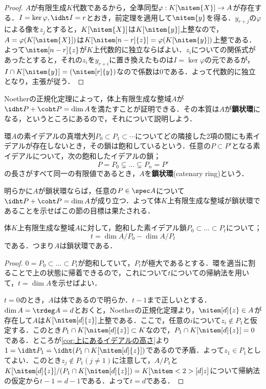 \begin{proof}
	$A$が有限生成$K$代数であるから，全準同型$\varphi:K[\nitem{X}]\to A$が存在する．$I=\ker\varphi, \idht I=r$とおき，前定理を適用して$\nitem{y}$を得る．$y_{r+j}$の$\varphi$による像を$z_j$とすると，$K[\nitem{X}]$は$K[\nitem{y}]$上整なので，$A=\varphi(K[\nitem{X}])$は$K[\nitem[n-r]{z}]=\varphi(K[\nitem{y}])$上整である．よって$\nitem[n-r]{z}$が$K$上代数的に独立ならばよい．$z_i$についての関係式があったとすると，それの$z_i$を$y_{r+i}$に置き換えたものは$I=\ker\varphi$の元であるが，$I\cap K[\nitem{y}]=(\nitem[r]{y})$なので係数は0である．よって代数的に独立となり，主張が従う．
\end{proof}

Noetherの正規化定理によって，体上有限生成な整域$A$が$\idht P +\coht P =\dim A$を満たすことが証明できる．その本質は$A$が\textbf{鎖状環}になる，というところにあるので，それについて説明しよう．
\begin{defi}[鎖状環]
	環$A$の素イデアルの真増大列$P_0\subset P_1\subset\cdots$についてどの隣接した2項の間にも素イデアルが存在しないとき，その鎖は飽和しているという．任意の$P\subset P'$となる素イデアルについて，次の飽和したイデアルの鎖；
	\[P=P_0\subsetneq\dots\subsetneq P_n= P'\]
	の長さがすべて同一の有限値であるとき，$A$を\textbf{鎖状環}(catenary ring)という．
\end{defi}

明らかに$A$が鎖状環ならば，任意の$P\in\spec A$について$\idht P +\coht P =\dim A$が成り立つ．よって体$K$上有限生成な整域が鎖状環であることを示せばこの節の目標は果たされる．

\begin{thm}
	体$K$上有限生成な整域$A$に対して，飽和した素イデアル鎖$P_0\subset\dots\subset P_t$について；
	\[t=\dim A/P_0-\dim A/P_t\]
	である．つまり$A$は鎖状環である．
\end{thm}

\begin{proof}
		$0=P_0\subset\dots\subset P_t$が飽和していて，$P_t$が極大であるとする．環を適当に割ることで上の状態に帰着できるので，これについて$t$についての帰納法を用いて，$t=\dim A$を示せばよい．
		
		$t=0$のとき，$A$は体であるので明らか．$t-1$まで正しいとする．$\dim A=\trdeg A=d$とおくと，Noetherの正規化定理より，$\nitem[d]{z}\in A$が存在して$A$は$K[\nitem[d]{z}]$上整である．ここで，任意の$i$について$z_i\not\in P_1$と仮定する．このとき$P_1\cap K[\nitem[d]{z}]\subset K$なので，$P_1\cap K[\nitem[d]{z}]=0$である．ところが\ref{cor:上にあるイデアルの高さ}より$1=\idht P_1=\idht (P_1\cap K[\nitem[d]{z}])$であるので矛盾．よって$z_1\in P_1$としてよい．このとき$z_j\not\in P_1 (j\neq1)$に注意して，$A/P_1$と$K[\nitem[d]{z}]/(P_1\cap K[\nitem[d]{z}])=K[\nitem<2>[d]{z}]$について帰納法の仮定から$t-1=d-1$である．よって$t=d$である．
\end{proof}


